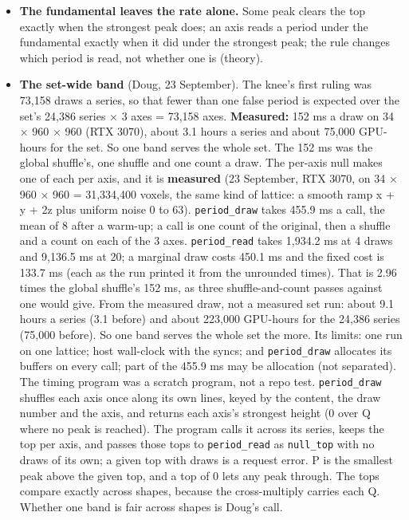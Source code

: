 \begin{itemize}
with each comparison a 128-bit cross-multiply. A period P also peaks at 2P and 3P with heights matching P's; the strongest peak picked a multiple; the smallest peak above the top picks P. An empty band, where no draw reached a peak, or a given top of 0 lets any peak through; the smallest peak is P. When none clears, P = 0 and the reported candidate is the strongest peak (the largest height, the smallest p on a tie). A lag that makes no peak at p and 2p is never a candidate. Nothing is rounded, and no constant is written in.
\item \textbf{The fundamental leaves the rate alone.} Some peak clears the top exactly when the strongest peak does; an axis reads a period under the fundamental exactly when it did under the strongest peak; the rule changes which period is read, not whether one is (theory).
\item \textbf{The set-wide band} (Doug, 23 September). The knee's first ruling was 73,158 draws a series, so that fewer than one false period is expected over the set's 24,386 series × 3 axes = 73,158 axes. \textbf{Measured:} 152 ms a draw on 34 × 960 × 960 (RTX 3070), about 3.1 hours a series and about 75,000 GPU-hours for the set. So one band serves the whole set. The 152 ms was the global shuffle's, one shuffle and one count a draw. The per-axis null makes one of each per axis, and it is \textbf{measured} (23 September, RTX 3070, on 34 × 960 × 960 = 31,334,400 voxels, the same kind of lattice: a smooth ramp x + y + 2z plus uniform noise 0 to 63). \texttt{period\_\allowbreak{}draw} takes 455.9 ms a call, the mean of 8 after a warm-up; a call is one count of the original, then a shuffle and a count on each of the 3 axes. \texttt{period\_\allowbreak{}read} takes 1,934.2 ms at 4 draws and 9,136.5 ms at 20; a marginal draw costs 450.1 ms and the fixed cost is 133.7 ms (each as the run printed it from the unrounded times). That is 2.96 times the global shuffle's 152 ms, as three shuffle-and-count passes against one would give. From the measured draw, not a measured set run: about 9.1 hours a series (3.1 before) and about 223,000 GPU-hours for the 24,386 series (75,000 before). So one band serves the whole set the more. Its limits: one run on one lattice; host wall-clock with the syncs; and \texttt{period\_\allowbreak{}draw} allocates its buffers on every call; part of the 455.9 ms may be allocation (not separated). The timing program was a scratch program, not a repo test. \texttt{period\_\allowbreak{}draw} shuffles each axis once along its own lines, keyed by the content, the draw number and the axis, and returns each axis's strongest height (0 over Q where no peak is reached). The program calls it across its series, keeps the top per axis, and passes those tops to \texttt{period\_\allowbreak{}read} as \texttt{null\_\allowbreak{}top} with no draws of its own; a given top with draws is a request error. P is the smallest peak above the given top, and a top of 0 lets any peak through. The tops compare exactly across shapes, because the cross-multiply carries each Q. Whether one band is fair across shapes is Doug's call.

\end{itemize}
